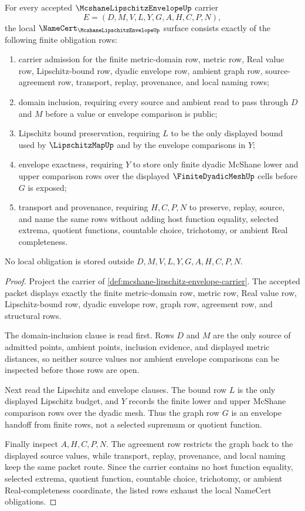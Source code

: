 \begin{theorem}
\label{thm:mcshane-extension-lipschitz-envelope-obligations}
For every accepted $\McshaneLipschitzEnvelopeUp$ carrier
$$
E=(D,M,V,L,Y,G,A,H,C,P,N),
$$
the local $\NameCert_{\McshaneLipschitzEnvelopeUp}$ surface consists exactly of the following finite obligation rows:
\begin{enumerate}
\item carrier admission for the finite metric-domain row, metric row, Real value row, Lipschitz-bound row, dyadic envelope row, ambient graph row, source-agreement row, transport, replay, provenance, and local naming rows;
\item domain inclusion, requiring every source and ambient read to pass through $D$ and $M$ before a value or envelope comparison is public;
\item Lipschitz bound preservation, requiring $L$ to be the only displayed bound used by $\LipschitzMapUp$ and by the envelope comparisons in $Y$;
\item envelope exactness, requiring $Y$ to store only finite dyadic McShane lower and upper comparison rows over the displayed $\FiniteDyadicMeshUp$ cells before $G$ is exposed;
\item transport and provenance, requiring $H,C,P,N$ to preserve, replay, source, and name the same rows without adding host function equality, selected extrema, quotient functions, countable choice, trichotomy, or ambient Real completeness.
\end{enumerate}
No local obligation is stored outside $D,M,V,L,Y,G,A,H,C,P,N$.
\end{theorem}
\begin{proof}
Project the carrier of \autoref{def:mcshane-lipschitz-envelope-carrier}. The accepted packet displays exactly the finite metric-domain row, metric row, Real value row, Lipschitz-bound row, dyadic envelope row, graph row, agreement row, and structural rows.

The domain-inclusion clause is read first. Rows $D$ and $M$ are the only source of admitted points, ambient points, inclusion evidence, and displayed metric distances, so neither source values nor ambient envelope comparisons can be inspected before those rows are open.

Next read the Lipschitz and envelope clauses. The bound row $L$ is the only displayed Lipschitz budget, and $Y$ records the finite lower and upper McShane comparison rows over the dyadic mesh. Thus the graph row $G$ is an envelope handoff from finite rows, not a selected supremum or quotient function.

Finally inspect $A,H,C,P,N$. The agreement row restricts the graph back to the displayed source values, while transport, replay, provenance, and local naming keep the same packet route. Since the carrier contains no host function equality, selected extrema, quotient function, countable choice, trichotomy, or ambient Real-completeness coordinate, the listed rows exhaust the local NameCert obligations.
\end{proof}


